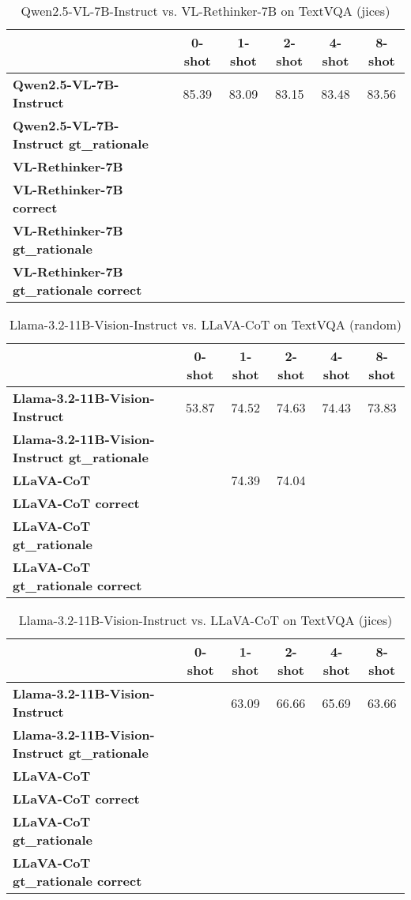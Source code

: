 \begin{table}
\caption{Qwen2.5-VL-7B-Instruct vs. VL-Rethinker-7B on TextVQA (jices)}
\label{tab:Qwen2.5-VL-7B-Instruct_TextVQA_TRAIN_jices}
\begin{tabular}{lccccc}
\toprule
 & 0-shot & 1-shot & 2-shot & 4-shot & 8-shot \\
\midrule
\textbf{Qwen2.5-VL-7B-Instruct} & 85.39 & 83.09 & 83.15 & 83.48 & 83.56 \\
\textbf{Qwen2.5-VL-7B-Instruct gt\_rationale} &  &  &  &  &  \\
\textbf{VL-Rethinker-7B} &  &  &  &  &  \\
\textbf{VL-Rethinker-7B correct} &  &  &  &  &  \\
\textbf{VL-Rethinker-7B gt\_rationale} &  &  &  &  &  \\
\textbf{VL-Rethinker-7B gt\_rationale correct} &  &  &  &  &  \\
\bottomrule
\end{tabular}
\end{table}


\begin{table}
\caption{Llama-3.2-11B-Vision-Instruct vs. LLaVA-CoT on TextVQA (random)}
\label{tab:Llama-3.2-11B-Vision-Instruct_TextVQA_TRAIN_random}
\begin{tabular}{lccccc}
\toprule
 & 0-shot & 1-shot & 2-shot & 4-shot & 8-shot \\
\midrule
\textbf{Llama-3.2-11B-Vision-Instruct} & 53.87 & 74.52 & 74.63 & 74.43 & 73.83 \\
\textbf{Llama-3.2-11B-Vision-Instruct gt\_rationale} &  &  &  &  &  \\
\textbf{LLaVA-CoT} &  & 74.39 & 74.04 &  &  \\
\textbf{LLaVA-CoT correct} &  &  &  &  &  \\
\textbf{LLaVA-CoT gt\_rationale} &  &  &  &  &  \\
\textbf{LLaVA-CoT gt\_rationale correct} &  &  &  &  &  \\
\bottomrule
\end{tabular}
\end{table}


\begin{table}
\caption{Llama-3.2-11B-Vision-Instruct vs. LLaVA-CoT on TextVQA (jices)}
\label{tab:Llama-3.2-11B-Vision-Instruct_TextVQA_TRAIN_jices}
\begin{tabular}{lccccc}
\toprule
 & 0-shot & 1-shot & 2-shot & 4-shot & 8-shot \\
\midrule
\textbf{Llama-3.2-11B-Vision-Instruct} &  & 63.09 & 66.66 & 65.69 & 63.66 \\
\textbf{Llama-3.2-11B-Vision-Instruct gt\_rationale} &  &  &  &  &  \\
\textbf{LLaVA-CoT} &  &  &  &  &  \\
\textbf{LLaVA-CoT correct} &  &  &  &  &  \\
\textbf{LLaVA-CoT gt\_rationale} &  &  &  &  &  \\
\textbf{LLaVA-CoT gt\_rationale correct} &  &  &  &  &  \\
\bottomrule
\end{tabular}
\end{table}


